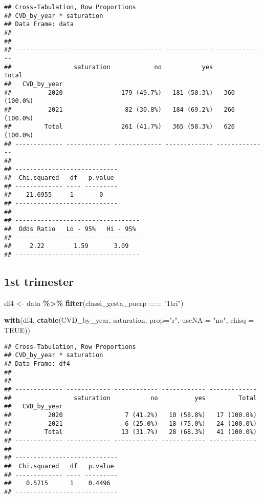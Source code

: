 \documentclass[
]{article}
\newenvironment{Shaded}{\begin{snugshade}}{\end{snugshade}}
\newcommand{\AttributeTok}[1]{\textcolor[rgb]{0.13,0.29,0.53}{#1}}
\newcommand{\ConstantTok}[1]{\textcolor[rgb]{0.56,0.35,0.01}{#1}}
\newcommand{\FunctionTok}[1]{\textcolor[rgb]{0.13,0.29,0.53}{\textbf{#1}}}
\newcommand{\NormalTok}[1]{#1}
\newcommand{\OtherTok}[1]{\textcolor[rgb]{0.56,0.35,0.01}{#1}}
\newcommand{\SpecialCharTok}[1]{\textcolor[rgb]{0.81,0.36,0.00}{\textbf{#1}}}
\newcommand{\StringTok}[1]{\textcolor[rgb]{0.31,0.60,0.02}{#1}}
\begin{document}
\begin{verbatim}
## Cross-Tabulation, Row Proportions  
## CVD_by_year * saturation  
## Data Frame: data  
## 
## 
## ------------- ------------ ------------- ------------- --------------
##                 saturation            no           yes          Total
##   CVD_by_year                                                        
##          2020                179 (49.7%)   181 (50.3%)   360 (100.0%)
##          2021                 82 (30.8%)   184 (69.2%)   266 (100.0%)
##         Total                261 (41.7%)   365 (58.3%)   626 (100.0%)
## ------------- ------------ ------------- ------------- --------------
## 
## ----------------------------
##  Chi.squared   df   p.value 
## ------------- ---- ---------
##    21.6955     1       0    
## ----------------------------
## 
## ----------------------------------
##  Odds Ratio   Lo - 95%   Hi - 95% 
## ------------ ---------- ----------
##     2.22        1.59       3.09   
## ----------------------------------
\end{verbatim}

\hypertarget{st-trimester-2}{%
\subsection{1st trimester}\label{st-trimester-2}}

\begin{Shaded}
\begin{Highlighting}[]
\NormalTok{df4 }\OtherTok{\textless{}{-}}\NormalTok{ data }\SpecialCharTok{\%\textgreater{}\%} 
  \FunctionTok{filter}\NormalTok{(classi\_gesta\_puerp }\SpecialCharTok{==} \StringTok{"1tri"}\NormalTok{)}

\FunctionTok{with}\NormalTok{(df4, }\FunctionTok{ctable}\NormalTok{(CVD\_by\_year, saturation, }\AttributeTok{prop=}\StringTok{"r"}\NormalTok{, }\AttributeTok{useNA =} \StringTok{"no"}\NormalTok{, }\AttributeTok{chisq =} \ConstantTok{TRUE}\NormalTok{))}
\end{Highlighting}
\end{Shaded}

\begin{verbatim}
## Cross-Tabulation, Row Proportions  
## CVD_by_year * saturation  
## Data Frame: df4  
## 
## 
## ------------- ------------ ------------ ------------ -------------
##                 saturation           no          yes         Total
##   CVD_by_year                                                     
##          2020                 7 (41.2%)   10 (58.8%)   17 (100.0%)
##          2021                 6 (25.0%)   18 (75.0%)   24 (100.0%)
##         Total                13 (31.7%)   28 (68.3%)   41 (100.0%)
## ------------- ------------ ------------ ------------ -------------
## 
## ----------------------------
##  Chi.squared   df   p.value 
## ------------- ---- ---------
##    0.5715      1    0.4496  
## ----------------------------
\end{verbatim}
\end{document}
